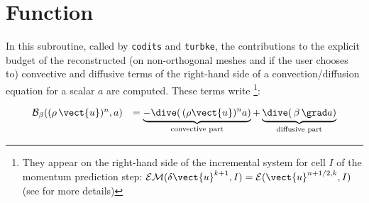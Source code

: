 
%
%
%
%



\hypertarget{bilsc2}{}

\vspace{1cm}
\section*{Function}

In this subroutine, called by \texttt{codits} and \texttt{turbke}, the
contributions to the explicit budget of the reconstructed (on
non-orthogonal meshes and if the user chooses to) convective and
diffusive terms of the right-hand side of a convection/diffusion
equation for a scalar $a$ are computed. These terms
write \footnote{They appear on the right-hand side of the incremental
system for cell $I$ of the momentum prediction step:
$\mathcal{EM}(\delta\vect{u}^{k+1},I) =
\mathcal{E}(\vect{u}^{n+1/2,k},I)$  (see  for more details)}:

\begin{equation}\label{Base_Bilsc2_eq_continue}
\begin{array}{ll}
\mathcal{B_{\mathcal{\beta}}}((\rho\,\vect{u})^{n},a)
&=\underbrace{-\dive(\,(\rho \vect{u})^{n}a)}_{\text {convective part}}
+\underbrace{\dive(\,\beta\,\grad a)}_{\text{diffusive part}}\\
\end{array}
\end{equation}

